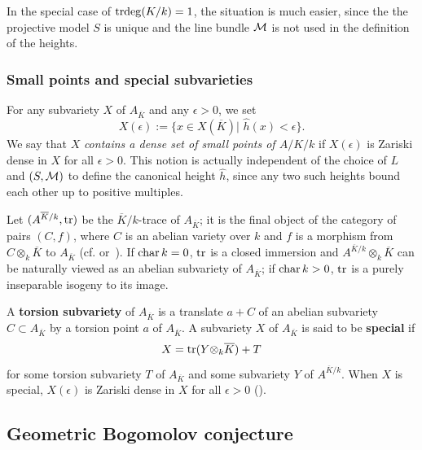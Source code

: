 \documentclass[12pt]{amsart}
\begin{document}
In the special case of ${\mathrm{trdeg}}(K/k)=1$, the situation is much easier, since the the projective model $S$ is unique and the line bundle ${\mathcal M}$ is not used in the definition of the heights.


\subsubsection{Small points and special subvarieties}
For any subvariety $X$ of  $A_{\overline{K}}$ and any $\epsilon> 0$, we set 
\begin{equation}
X(\epsilon):=\{x\in X(\overline{K})|\,\, \hat{h}(x)<\epsilon\}.
\end{equation}
We say that $X$ \emph{contains a dense set of small points of $A/K/k$} if $X(\epsilon)$ is Zariski dense in $X$ for all $\epsilon >0$.
This notion is actually independent of the choice of $L$ and $(S,{\mathcal M})$ to define the canonical height $\hat h$, since any two such heights bound each other up to positive  multiples.

Let $(A^{\overline{K}/k}, {\rm tr})$ be the $\overline{K}/k$-trace of  $A_{\overline{K}}$; it
is the final object of the category of pairs $(C,f)$, where $C$ is an abelian variety over $ k$ and $f$ is 
a morphism from $C\otimes_{ k}\overline{K}$ to  $A_{\overline{K}}$ (cf. \cite[$\mathsection$7]{Lang:AbelianBook} or~\cite[$\mathsection$6]{Conrad}).
If ${\rm char\,} k=0$, ${\rm tr}$ is a closed immersion and $A^{\overline{K}/ k}\otimes_{k}\overline{K}$ can be naturally viewed 
as an abelian subvariety of $A_{\overline{K}}$;
if ${\rm char\,} k>0$, ${\rm tr}$ is a purely inseparable isogeny to its image. 

A {\bf{torsion subvariety}} of $A_{\overline K}$ is a translate $a+C$ of an abelian 
subvariety $C\subset A_{\overline K}$ by a torsion point $a$ of $A_{\overline K}$. A subvariety $X$ of $A_{\overline{K}}$ is said to be {\bf{special}} if  
\begin{equation}
X={\rm tr}(Y{\otimes_{k}\overline{K}})+T
\end{equation}
for some torsion subvariety $T$ of $A_{\overline{K}}$ and  some subvariety $Y$ of $A^{\overline{K}/k}$.
When $X$ is special,  $X(\epsilon)$ is Zariski dense in $X$ for all $\epsilon >0$ (\cite[Theorem 5.4, Chapter 6]{Lang1983}).



\subsection{Geometric Bogomolov conjecture}
\end{document}
